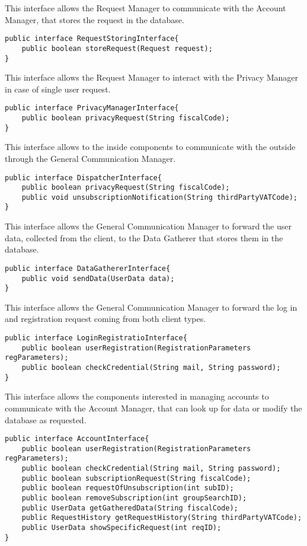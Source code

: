 This interface allows the Request Manager to communicate with the Account Manager, that stores the request in the database.
\begin{lstlisting}
public interface RequestStoringInterface{	
	public boolean storeRequest(Request request);
}
\end{lstlisting}

This interface allows the Request Manager to interact with the Privacy Manager in case of single user request.
\begin{lstlisting}
public interface PrivacyManagerInterface{
	public boolean privacyRequest(String fiscalCode);
}
\end{lstlisting}

This interface allows to the inside components to communicate with the outside through the General Communication Manager.
\begin{lstlisting}
public interface DispatcherInterface{
	public boolean privacyRequest(String fiscalCode);
	public void unsubscriptionNotification(String thirdPartyVATCode);
}
\end{lstlisting}

This interface allows the General Communication Manager to forward the user data, collected from the client, to the Data Gatherer that stores them in the database.
\begin{lstlisting}
public interface DataGathererInterface{
	public void sendData(UserData data);
}
\end{lstlisting}

This interface allows the General Communication Manager to forward the log in and registration request coming from both client types.
\begin{lstlisting}
public interface LoginRegistratioInterface{
	public boolean userRegistration(RegistrationParameters regParameters);
	public boolean checkCredential(String mail, String password);
}
\end{lstlisting}

This interface allows the components interested in managing accounts to communicate with the Account Manager, that can look up for data or modify the database as requested.
\begin{lstlisting}
public interface AccountInterface{
	public boolean userRegistration(RegistrationParameters regParameters);
	public boolean checkCredential(String mail, String password);
	public boolean subscriptionRequest(String fiscalCode);
	public boolean requestOfUnsubscription(int subID);
	public boolean removeSubscription(int groupSearchID);
	public UserData getGatheredData(String fiscalCode);
	public RequestHistory getRequestHistory(String thirdPartyVATCode);
	public UserData showSpecificRequest(int reqID);
}
\end{lstlisting}

